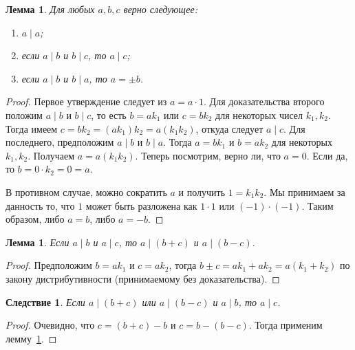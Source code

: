 \documentclass[12pt,notitlepage]{article}
\theoremstyle{plain}
\newtheorem{lemma}[thm]{Лемма}
\newtheorem{corr}[thm]{Следствие}
\theoremstyle{definition}
\theoremstyle{plain}
\newcommand{\1}{\mathbf{1}}
\newcommand{\0}{\mathbf{0}}
\newcommand{\dvd}{\mathop{\mid}}
\begin{document}
\begin{lemma}\label{L4:l1}
	Для любых $a,b,c$ верно следующее:
	\begin{enumerate}
		\item $a \dvd a$;
		\item если $a \dvd b$ и $b \dvd c$, то $a \dvd c$;
		\item если $a \dvd b$ и $b \dvd a$, то $a = \pm b$.
	\end{enumerate}
\end{lemma}
\begin{proof}
	Первое утверждение следует из $a = a \cdot 1$. Для доказательства второго положим $a \dvd b$ и $b \dvd c$, то есть $b = ak_1$ или $c = bk_2$ для некоторых чисел $k_1, k_2$. Тогда имеем $c = bk_2 = (a k_1) k_2 = a (k_1 k_2)$, откуда следует $a \dvd c$. Для последнего, предположим $a \dvd b$ и $b \dvd a$. Тогда $a = b k_1$ и $b = a k_2$ для некоторых $k_1, k_2$. Получаем $a = a (k_1 k_2)$. Теперь посмотрим, верно ли, что $a = 0$. Если да, то $b = 0 \cdot k_2 = 0 = a$.
	
	В противном случае, можно сократить $a$ и получить $1 = k_1 k_2$. Мы принимаем за данность то, что $1$ может быть разложена как $1\cdot 1$ или $(-1) \cdot (-1)$. Таким образом, либо $a = b$, либо $a = -b$.
\end{proof}

\begin{lemma}\label{L4:l2}
	Если $a \dvd b$ и $a \dvd c$, то $a \dvd (b + c)$ и $a \dvd (b - c)$.
\end{lemma}
\begin{proof}
	Предположим $b = ak_1$ и $c = ak_2$, тогда $b \pm c = ak_1 + ak_2 = a(k_1 + k_2)$ по закону дистрибутивности (принимаемому без доказательства).
\end{proof}
\begin{corr}\label{L4:c3}
	Если $a \dvd (b + c)$ или $a \dvd (b - c) $ и $a \dvd b$, то $a \dvd c$.
\end{corr}
\begin{proof}
	Очевидно, что $c = (b + c) - b$ и $c = b - (b - c)$. Тогда применим лемму~\ref{L4:l2}.
\end{proof}
\end{document}
